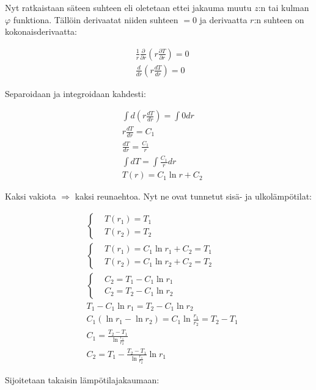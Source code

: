 \documentclass[12pt,a4paper,finnish]{article}
\begin{document}
Nyt ratkaistaan säteen suhteen eli oletetaan ettei jakauma muutu $z$:n tai kulman $\varphi$ funktiona. 
Tällöin derivaatat niiden suhteen $= 0$ ja derivaatta $r$:n suhteen on kokonaisderivaatta:

\begin{align}
 &\frac{1}{r}\frac{\partial}{\partial r}\left(r\frac{\partial T}{\partial r}\right) = 0\\
 &\frac{d}{d r}\left(r\frac{d T}{d r}\right) = 0
\end{align}

Separoidaan ja integroidaan kahdesti:

\begin{align}
 &\int d\left(r\frac{d T}{d r}\right) = \int 0 dr\\
 &r\frac{d T}{d r} = C_1\\
 &\frac{d T}{d r} = \frac{C_1}{r} \label{eq:int18}\\
 &\int dT = \int\frac{C_1}{r}dr\\
 &T(r) = C_1\ln r + C_2
\end{align}

Kaksi vakiota $\Rightarrow$ kaksi reunaehtoa. Nyt ne ovat tunnetut sisä- ja ulkolämpötilat:

\begin{align}
 &\left\{
 \begin{aligned}
  &T(r_1) = T_1\\
  &T(r_2) = T_2
 \end{aligned}\right.\\
 &\left\{
 \begin{aligned}
  &T(r_1) = C_1\ln r_1 + C_2 = T_1\\
  &T(r_2) = C_1\ln r_2 + C_2 = T_2
 \end{aligned}\right.\\
 &\left\{
 \begin{aligned}
  &C_2 = T_1 - C_1\ln r_1\\
  &C_2 = T_2 - C_1\ln r_2
 \end{aligned}\right.\\
 &T_1 - C_1\ln r_1 = T_2 - C_1\ln r_2\\
 &C_1(\ln r_1 - \ln r_2) = C_1\ln \frac{r_1}{r_2} = T_2 - T_1\\
 &C_1 = \frac{T_2 - T_1}{\ln \frac{r_1}{r_2}} \label{eq:C_1}\\
 &C_2 = T_1 - \frac{T_2 - T_1}{\ln \frac{r_1}{r_2}}\ln r_1
\end{align}

Sijoitetaan takaisin lämpötilajakaumaan:
\end{document}
